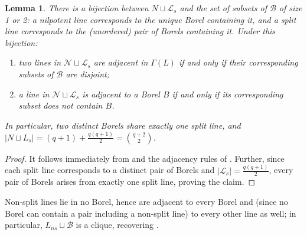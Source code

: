\documentclass[11pt]{amsart}
\theoremstyle{plain}
\newtheorem{lemma}[theorem]{Lemma}
\begin{document}
\begin{lemma}\label{bijection}
There is a bijection between $N\sqcup \mathcal{L}_s$ and the set of subsets
of $\mathcal{B}$ of size 1 or 2: a nilpotent line corresponds to the unique Borel containing it, and a split line corresponds to the (unordered) pair of Borels containing it.  Under this bijection:
\begin{enumerate}
  \item two lines in $\mathcal{N}\sqcup \mathcal{L}_s$ are adjacent in $\Gamma(L)$ if and only if their corresponding subsets of $\mathcal{B}$ are disjoint;
  \item a line in $\mathcal{N}\sqcup \mathcal{L}_s$ is adjacent to a Borel $B$ if and only if its corresponding subset does not contain $B$.
\end{enumerate}
In particular, two distinct Borels share exactly one split line, and
$|N\sqcup L_s| =(q+1) +  \tfrac{q(q+1)}{2} =\binom{q+2}{2}$.
\end{lemma}

\begin{proof}
It follows immediately from \cite[Lemma 4.14]{TZG} and the adjacency rules of \cite[Proposition 4.11]{TZG}. Further, since each split line corresponds to a distinct pair of Borels and $|\mathcal{L}_s|= \tfrac{q(q+1)}{2}$, every pair of Borels arises from exactly one split line, proving the claim.
\end{proof}


Non-split lines lie in no Borel, hence are adjacent to every Borel and (since no Borel can contain a pair including a non-split line) to every other line as well; in particular, $L_{ns}\sqcup\mathcal{B}$ is a clique, recovering \cite[Corollary 4.16 (3)]{TZG}.
\end{document}

